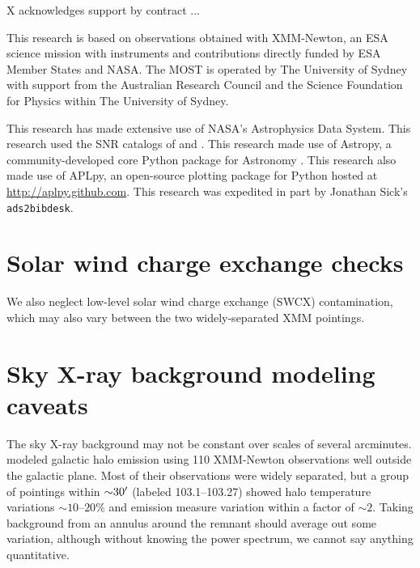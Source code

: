 \documentclass[preprint2,tighten,trackchanges]{aastex6}
\newcommand*{\abt}{\mathord{\sim}} %
\begin{document}
\acknowledgments

X acknowledges support by contract ...

This research is based on observations obtained with XMM-Newton, an ESA science
mission with instruments and contributions directly funded by ESA Member States
and NASA.
The MOST is operated by The University of Sydney with support from the
Australian Research Council and the Science Foundation for Physics within The
University of Sydney.

This research has made extensive use of NASA's Astrophysics Data System.
This research used the SNR catalogs of \citet{ferrand2012} and
\citet{green2014}.
This research made use of Astropy, a community-developed core Python package
for Astronomy \citep{astropy2013}.
This research also made use of APLpy, an open-source plotting package for
Python hosted at \url{http://aplpy.github.com}.
This research was expedited in part by Jonathan Sick's \texttt{ads2bibdesk}.






\clearpage  %
\appendix

\setcounter{table}{0}
\renewcommand{\thetable}{A\arabic{table}}
\setcounter{figure}{0}
\renewcommand{\thefigure}{A\arabic{figure}}

\section{Solar wind charge exchange checks}

We also neglect low-level solar wind charge exchange (SWCX) contamination,
which may also vary between the two widely-separated XMM pointings.


\section{Sky X-ray background modeling caveats}

The sky X-ray background may not be constant over scales of several arcminutes.
\citet{henley2013} modeled galactic halo emission using 110 XMM-Newton
observations well outside the galactic plane.
Most of their observations were widely separated, but a group of pointings
within $\abt 30\arcmin$ (labeled 103.1--103.27) showed halo temperature
variations $\abt 10$--$20\%$ and emission measure variation within a factor of
$\abt 2$.
Taking background from an annulus around the remnant should average out some
variation, although without knowing the power spectrum, we cannot say anything
quantitative.
\end{document}

